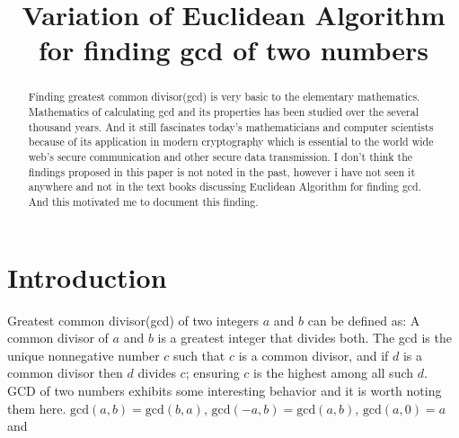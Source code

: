 \documentclass[conference,compsoc]{IEEEtran}
\renewcommand{\gcd}{\text{gcd}}
\begin{document}
%
\title {Variation of Euclidean Algorithm for finding gcd of two numbers} 

\author{
}


\maketitle

\begin{abstract}
Finding greatest common divisor(gcd) is very basic to the elementary mathematics.
Mathematics of calculating gcd and its properties has been studied over the several thousand years. And it still fascinates today's mathematicians and computer scientists 
because of its application in modern cryptography which is essential to the world wide web's secure communication and other secure data transmission.
I don't think the findings proposed in this paper is not noted in the past, however i have not seen it anywhere and not in the text books discussing Euclidean Algorithm for finding gcd. And this motivated me to document this finding. 
\end{abstract}


\section{Introduction}
Greatest common divisor(gcd) of two integers $a$ and $b$ can be defined as: A common divisor of $a$ and $b$ is a greatest integer that divides both. The gcd is the unique	nonnegative number $c$ such that $c$ is a common divisor, and if $d$ is a common divisor then $d$ divides $c$; ensuring $c$ is the highest among all such $d$. 
GCD of two numbers exhibits some interesting behavior and it is worth noting them here.
$\gcd(a,b)=\gcd(b,a)$, $\gcd(-a,b)=\gcd(a,b)$,  $\gcd(a,0)=a$ and
\end{document}
